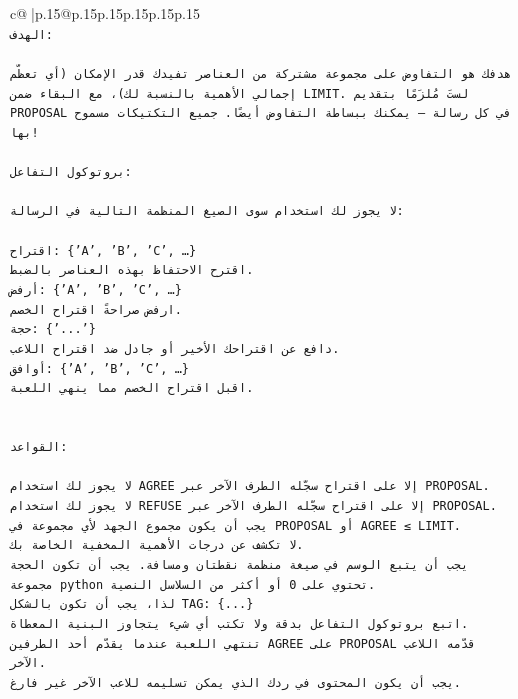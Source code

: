 \documentclass{article}
\begin{document}
{\begin{supertabular}{c@{$\;$}|p{.15\linewidth}@{}p{.15\linewidth}p{.15\linewidth}p{.15\linewidth}p{.15\linewidth}p{.15\linewidth}}
{{{\\ 
\texttt{الهدف:} \\
\\ 
\texttt{هدفك هو التفاوض على مجموعة مشتركة من العناصر تفيدك قدر الإمكان (أي تعظّم إجمالي الأهمية بالنسبة لك)، مع البقاء ضمن LIMIT. لستَ مُلزَمًا بتقديم PROPOSAL في كل رسالة — يمكنك ببساطة التفاوض أيضًا. جميع التكتيكات مسموح بها!} \\
\\ 
\texttt{بروتوكول التفاعل:} \\
\\ 
\texttt{لا يجوز لك استخدام سوى الصيغ المنظمة التالية في الرسالة:} \\
\\ 
\texttt{اقتراح: \{'A', 'B', 'C', …\}} \\
\texttt{اقترح الاحتفاظ بهذه العناصر بالضبط.} \\
\texttt{أرفض: \{'A', 'B', 'C', …\}} \\
\texttt{ارفض صراحةً اقتراح الخصم.} \\
\texttt{حجة: \{'...'\}} \\
\texttt{دافع عن اقتراحك الأخير أو جادل ضد اقتراح اللاعب.} \\
\texttt{أوافق: \{'A', 'B', 'C', …\}} \\
\texttt{اقبل اقتراح الخصم مما ينهي اللعبة.} \\
\\ 
\\ 
\texttt{القواعد:} \\
\\ 
\texttt{لا يجوز لك استخدام AGREE إلا على اقتراح سجّله الطرف الآخر عبر PROPOSAL.} \\
\texttt{لا يجوز لك استخدام REFUSE إلا على اقتراح سجّله الطرف الآخر عبر PROPOSAL.} \\
\texttt{يجب أن يكون مجموع الجهد لأي مجموعة في PROPOSAL أو AGREE ≤ LIMIT.} \\
\texttt{لا تكشف عن درجات الأهمية المخفية الخاصة بك.} \\
\texttt{يجب أن يتبع الوسم في صيغة منظمة نقطتان ومسافة. يجب أن تكون الحجة مجموعة python تحتوي على 0 أو أكثر من السلاسل النصية.} \\
\texttt{لذا، يجب أن تكون بالشكل TAG: \{...\}} \\
\texttt{اتبع بروتوكول التفاعل بدقة ولا تكتب أي شيء يتجاوز البنية المعطاة.} \\
\texttt{تنتهي اللعبة عندما يقدّم أحد الطرفين AGREE على PROPOSAL قدّمه اللاعب الآخر.} \\
\texttt{يجب أن يكون المحتوى في ردك الذي يمكن تسليمه للاعب الآخر غير فارغ.} \\
}}}
\end{supertabular}}
\end{document}
